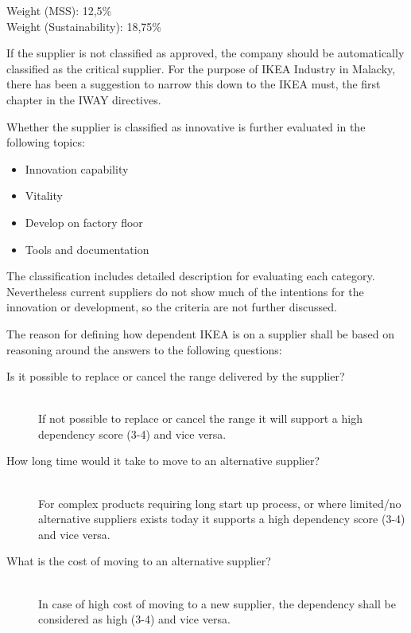 \documentclass[oneside,12pt]{article}%
\begin{document}
\vspace{2mm}
\noindent Weight (MSS): 12,5\% \\
Weight (Sustainability): 18,75\%
\vspace{2mm}\par

If the supplier is not classified as approved, the company should be automatically classified as the critical supplier. For the purpose of IKEA Industry in Malacky, there has been a suggestion to narrow this down to the IKEA must, the first chapter in the IWAY directives.


Whether the supplier is classified as innovative is further evaluated in the following topics:
\begin{itemize}
  \item Innovation capability
  \item Vitality
  \item Develop on factory floor
  \item Tools and documentation
\end{itemize}
The classification includes detailed description for evaluating each category. Nevertheless current suppliers do not show much of the intentions for the innovation or development, so the criteria are not further discussed.


The reason for defining how dependent IKEA is on a supplier shall be based on reasoning around the answers to the following questions:

\begin{description}
  \item[Is it possible to replace or cancel the range delivered by the supplier? ] \hfill \\
  If not possible to replace or cancel the range it will support a high dependency score (3-4) and vice versa.

  \item[How long time would it take to move to an alternative supplier? ] \hfill \\
  For complex products requiring long start up process, or where limited/no alternative suppliers exists today it supports a high dependency score (3-4) and vice versa.

  \item[What is the cost of moving to an alternative supplier?] \hfill \\
  In case of high cost of moving to a new supplier, the dependency shall be considered as high (3-4) and vice versa.

\end{description}
\end{document}
